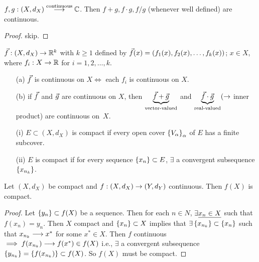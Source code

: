 \documentclass[]{article}
\begin{document}
\begin{theorem}
	\label{thm-4-9}
	$f,g:(X,d_X)\os{\text{continuous}}{\lra}\mb C$.
	Then $f+g,f\cdot g,f/g$ (whenever well defined) are continuous.
\end{theorem}
\begin{proof}
	skip.
\end{proof}
\begin{theorem}
	\label{thm-4-10}
	$\vf:(X,d_X)\ra\mb R^k$ with $k\geq 1$ defined by $\vf(x) = (f_1(x),f_2(x),\dots,f_k(x))$; $x\in X$, where $f_i:X\ra\mb R$ for $i=1,2,\dots,k$.
	\begin{enumerate}
		\item[(a)] $\vf$ is continuous on $X \iff$ each $f_i$ is continuous on $X$.
		\item[(b)] if $\vf$ and $\vg$ are continuous on $X$, then $\ub{\text{vector-valued}}{\vf+\vg}$ and $\ub{\text{real-valued}}{\vf\cdot\vg} (\ra$ inner product) are continuous on~$X$.
	\end{enumerate}
\end{theorem}

\begin{recall}
	\begin{enumerate}
		\item[(i)] $E\subset(X,d_X)$ is compact if every open cover $\set{V_\alpha}_\alpha$ of $E$ has a finite subcover.
		\item[(ii)] $E$ is compact if for every sequence $\set{x_n}\subset E$, $\exists$ a convergent subsequence $\set{x_{n_k}}$.
	\end{enumerate}
\end{recall}
\begin{theorem}
	\label{thm-4-14}
	Let $(X,d_X)$ be compact and $f:(X,d_X)\ra(Y,d_Y)$ continuous.
	Then $f(X)$ is compact.
\end{theorem}
\begin{proof}
	Let $\set{y_n}\subset f(X)$ be a sequence.
	Then for each $n\in N$, $\exists \ul{x_n\in X}$ such that $f(x_n)=y_n$.
	Then $X$ compact and $\set{x_n}\subset X$ implies that $\exists\set{x_{n_k}}\subset\set{x_n}$ such that $x_{n_k}\lra x^*$ for some $x^*\in X$.
	Then $f$ continuous $\implies f(x_{n_k}) \lra f(x^*)\in f(X)$ i.e., $\exists$ a convergent subsequence $\set{y_{n_k}} = \set{f(x_{n_k})}\subset f(X)$.
	So $f(X)$ must be compact.
\end{proof}

\newpage
\end{document}
